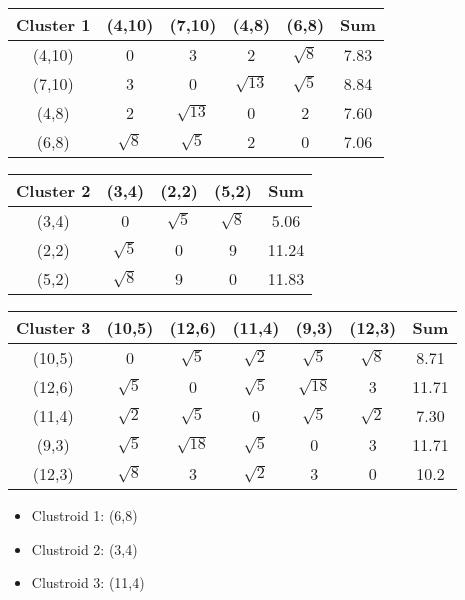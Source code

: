 \documentclass{article}
\begin{document}
\begin{enumerate}
{	\begin{tabular}{ c | c | c | c | c || c}
		Cluster 1 & (4,10)     & (7,10)      & (4,8)       & (6,8)      & Sum  \\ \hline
		(4,10)    & 0          & 3           & 2           & $\sqrt{8}$ & 7.83 \\
		(7,10)    & 3          & 0           & $\sqrt{13}$ & $\sqrt{5}$ & 8.84 \\
		(4,8)     & 2          & $\sqrt{13}$ & 0           & 2          & 7.60 \\
		(6,8)     & $\sqrt{8}$ & $\sqrt{5}$  & 2           & 0          & 7.06
	\end{tabular}

	\begin{tabular}{ c | c | c | c || c}
		Cluster 2 & (3,4)      & (2,2)      & (5,2)      & Sum   \\ \hline
		(3,4)     & 0          & $\sqrt{5}$ & $\sqrt{8}$ & 5.06  \\
		(2,2)     & $\sqrt{5}$ & 0          & 9          & 11.24 \\
		(5,2)     & $\sqrt{8}$ & 9          & 0          & 11.83
	\end{tabular}

	\begin{tabular}{ c | c | c | c | c | c || c}
		Cluster 3 & (10,5)     & (12,6)      & (11,4)     & (9,3)       & (12,3)     & Sum   \\ \hline
		(10,5)    & 0          & $\sqrt{5}$  & $\sqrt{2}$ & $\sqrt{5}$  & $\sqrt{8}$ & 8.71  \\
		(12,6)    & $\sqrt{5}$ & 0           & $\sqrt{5}$ & $\sqrt{18}$ & 3          & 11.71 \\
		(11,4)    & $\sqrt{2}$ & $\sqrt{5}$  & 0          & $\sqrt{5}$  & $\sqrt{2}$ & 7.30  \\
		(9,3)     & $\sqrt{5}$ & $\sqrt{18}$ & $\sqrt{5}$ & 0           & 3          & 11.71 \\
		(12,3)    & $\sqrt{8}$ & 3           & $\sqrt{2}$ & 3           & 0          & 10.2
	\end{tabular}

	\begin{itemize}
	\item Clustroid 1: (6,8)
	\item Clustroid 2: (3,4)
	\item Clustroid 3: (11,4)
\end{itemize}	
}
\end{enumerate}
\end{document}
